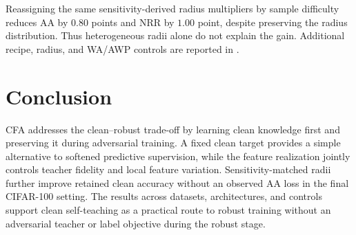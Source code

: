 \documentclass{article} %
\theoremstyle{plain}
\begin{document}
Reassigning the same sensitivity-derived radius multipliers by sample
difficulty reduces AA by \(0.80\) points and NRR by \(1.00\) point, despite
preserving the radius distribution. Thus heterogeneous radii alone do not
explain the gain. Additional recipe, radius, and WA/AWP controls are reported
in .

\section{Conclusion}
CFA addresses the clean--robust trade-off by learning clean knowledge first
and preserving it during adversarial training. A fixed clean target provides
a simple alternative to softened predictive supervision, while the feature
realization jointly controls teacher fidelity and local feature variation.
Sensitivity-matched radii further improve retained clean accuracy without an
observed AA loss in the final CIFAR-100 setting. The results across datasets,
architectures, and controls support clean self-teaching as a practical route
to robust training without an adversarial teacher or label objective during
the robust stage.






\end{document}
